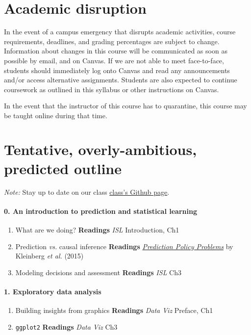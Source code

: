 \documentclass[10pt]{article}
\begin{document}
\section*{Academic disruption}

In the event of a campus emergency that disrupts academic activities, course requirements, deadlines, and grading
percentages are subject to change. Information about changes in this course will be communicated as soon as possible by email, and on Canvas. If we are not able to meet face-to-face, students should immediately log onto Canvas and read any announcements and/or access alternative assignments. Students are also expected to continue coursework as outlined in this syllabus or other instructions on Canvas.

In the event that the instructor of this course has to quarantine, this course may be taught online during that time.

\newpage

\section*{Tentative, overly-ambitious, predicted outline}

\textit{Note:} Stay up to date on our class \href{https://github.com/edrubin/EC524W22/}{class's Github page}.

\paragraph{0. An introduction to prediction and statistical learning}
\begin{enumerate}
  \item What are we doing? \textbf{Readings} \textit{ISL} Introduction, Ch1
  \item Prediction \textit{vs.} causal inference \textbf{Readings} \href{https://www.aeaweb.org/articles?id=10.1257/aer.p20151023}{\textit{Prediction Policy Problems}} by Kleinberg \textit{et al.} (2015)
  \item Modeling decisions and assessment \textbf{Readings} \textit{ISL} Ch3
\end{enumerate}

\paragraph{1. Exploratory data analysis}
\begin{enumerate}
  \item Building insights from graphics \textbf{Readings} \textit{Data Viz} Preface, Ch1
  \item \texttt{ggplot2} \textbf{Readings} \textit{Data Viz} Ch3
\end{enumerate}
\end{document}
